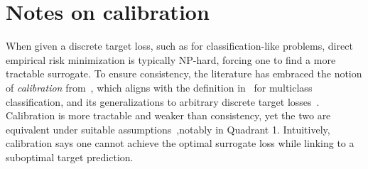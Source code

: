 \documentclass[11pt]{article} %
\newcommand{\Comments}{1}
\newcommand{\mytodo}[2]{\ifnum\Comments=1%
	\todo[linecolor=#1!80!black,backgroundcolor=#1,bordercolor=#1!80!black]{#2}\fi}
\newcommand{\jessiet}[1]{\mytodo{purple!20!white}{JF: #1}}
\begin{document}


\section{Notes on calibration}\label{app:calibration}

When given a discrete target loss, such as for classification-like problems, direct empirical risk minimization is typically NP-hard, forcing one to find a more tractable surrogate.
To ensure consistency, the literature has embraced the notion of \emph{calibration} from~\citet[Chapter 3]{steinwart2008support}, which aligns with the definition in~\citet{tewari2007consistency} for multiclass classification, and its generalizations to arbitrary discrete target losses~\citep{agarwal2015consistent,ramaswamy2016convex}.
Calibration is more tractable and weaker than consistency, yet the two are equivalent under suitable assumptions~\citep{tewari2007consistency,ramaswamy2016convex},notably in Quadrant 1.
Intuitively, calibration says one cannot achieve the optimal surrogate loss while linking to a suboptimal target prediction.

\end{document}
